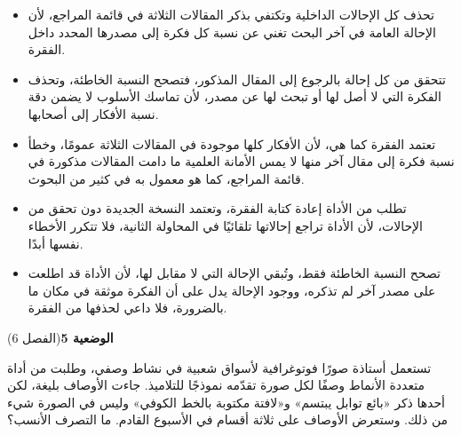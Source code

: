 \documentclass[11pt,a4paper]{article}
\begin{document}
\begin{itemize}[leftmargin=1.0cm, labelsep=6pt, itemsep=3pt, topsep=4pt, parsep=0pt]
  \item[\textbf{أ)}] تحذف كل الإحالات الداخلية وتكتفي بذكر المقالات الثلاثة في قائمة المراجع، لأن الإحالة العامة في آخر البحث تغني عن نسبة كل فكرة إلى مصدرها المحدد داخل الفقرة.
  \item[\textbf{ب)}] تتحقق من كل إحالة بالرجوع إلى المقال المذكور، فتصحح النسبة الخاطئة، وتحذف الفكرة التي لا أصل لها أو تبحث لها عن مصدر، لأن تماسك الأسلوب لا يضمن دقة نسبة الأفكار إلى أصحابها.
  \item[\textbf{ج)}] تعتمد الفقرة كما هي، لأن الأفكار كلها موجودة في المقالات الثلاثة عمومًا، وخطأ نسبة فكرة إلى مقال آخر منها لا يمس الأمانة العلمية ما دامت المقالات مذكورة في قائمة المراجع، كما هو معمول به في كثير من البحوث.
  \item[\textbf{د)}] تطلب من الأداة إعادة كتابة الفقرة، وتعتمد النسخة الجديدة دون تحقق من الإحالات، لأن الأداة تراجع إحالاتها تلقائيًا في المحاولة الثانية، فلا تتكرر الأخطاء نفسها أبدًا.
  \item[\textbf{هـ)}] تصحح النسبة الخاطئة فقط، وتُبقي الإحالة التي لا مقابل لها، لأن الأداة قد اطلعت على مصدر آخر لم تذكره، ووجود الإحالة يدل على أن الفكرة موثقة في مكان ما بالضرورة، فلا داعي لحذفها من الفقرة.
\end{itemize}
\par\vspace{6pt}
\noindent
{\large\khatt\textbf{الوضعية 5}}\hfill{\small(الفصل 6)}\par\nopagebreak\vspace{3pt}
\setlength{\fboxsep}{7pt}\colorbox{gray!10}{\parbox{\dimexpr\linewidth-14pt}{تستعمل أستاذة صورًا فوتوغرافية لأسواق شعبية في نشاط وصفي، وطلبت من أداة متعددة الأنماط وصفًا لكل صورة تقدّمه نموذجًا للتلاميذ. جاءت الأوصاف بليغة، لكن أحدها ذكر «بائع توابل يبتسم» و«لافتة مكتوبة بالخط الكوفي» وليس في الصورة شيء من ذلك. وستعرض الأوصاف على ثلاثة أقسام في الأسبوع القادم. ما التصرف الأنسب؟}}\par\nopagebreak
\end{document}
